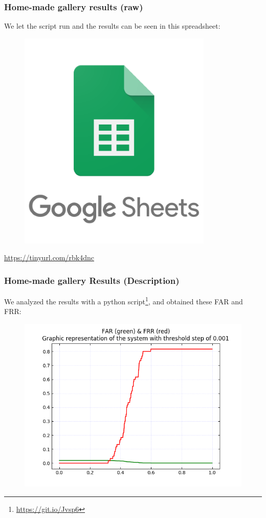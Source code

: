 \begin{frame} \frametitle{Home-made gallery results (raw)}
	
	\begin{center}
		We let the script run and the results can be seen in this spreadsheet:
		\begin{figure}[H]
			\includegraphics[width=.3\textwidth]{img/sheets}
		\end{figure}
		{\color{red} \url{https://tinyurl.com/rbk4dnc}}	
	\end{center}
	\vfill

\end{frame}

\begin{frame} \frametitle{Home-made gallery Results (Description)}

	We analyzed the results with a python script\footnote{{\color{red} 
	\url{https://git.io/Jvsp6}}}, and obtained these FAR and FRR:
	
	\vfill
	\begin{center}
		\begin{figure}[H]
			\includegraphics[width=.7\textwidth]{img/far-frr}
		\end{figure}
	\end{center}
	\vfill

\end{frame}

